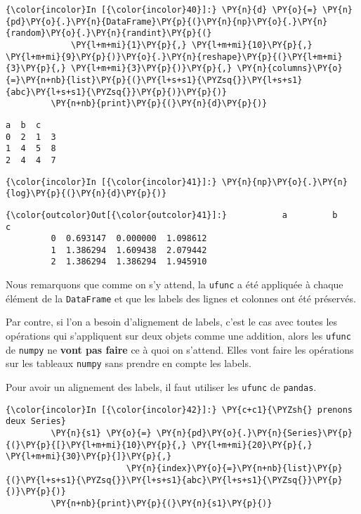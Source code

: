    \begin{Verbatim}[commandchars=\\\{\}]
{\color{incolor}In [{\color{incolor}40}]:} \PY{n}{d} \PY{o}{=} \PY{n}{pd}\PY{o}{.}\PY{n}{DataFrame}\PY{p}{(}\PY{n}{np}\PY{o}{.}\PY{n}{random}\PY{o}{.}\PY{n}{randint}\PY{p}{(}
             \PY{l+m+mi}{1}\PY{p}{,} \PY{l+m+mi}{10}\PY{p}{,} \PY{l+m+mi}{9}\PY{p}{)}\PY{o}{.}\PY{n}{reshape}\PY{p}{(}\PY{l+m+mi}{3}\PY{p}{,} \PY{l+m+mi}{3}\PY{p}{)}\PY{p}{,} \PY{n}{columns}\PY{o}{=}\PY{n+nb}{list}\PY{p}{(}\PY{l+s+s1}{\PYZsq{}}\PY{l+s+s1}{abc}\PY{l+s+s1}{\PYZsq{}}\PY{p}{)}\PY{p}{)}
         \PY{n+nb}{print}\PY{p}{(}\PY{n}{d}\PY{p}{)}
\end{Verbatim}


    \begin{Verbatim}[commandchars=\\\{\}]
   a  b  c
0  2  1  3
1  4  5  8
2  4  4  7

    \end{Verbatim}

    \begin{Verbatim}[commandchars=\\\{\}]
{\color{incolor}In [{\color{incolor}41}]:} \PY{n}{np}\PY{o}{.}\PY{n}{log}\PY{p}{(}\PY{n}{d}\PY{p}{)}
\end{Verbatim}


\begin{Verbatim}[commandchars=\\\{\}]
{\color{outcolor}Out[{\color{outcolor}41}]:}           a         b         c
         0  0.693147  0.000000  1.098612
         1  1.386294  1.609438  2.079442
         2  1.386294  1.386294  1.945910
\end{Verbatim}
            
    Nous remarquons que comme on s'y attend, la \texttt{ufunc} a été
appliquée à chaque élément de la \texttt{DataFrame} et que les labels
des lignes et colonnes ont été préservés.

    Par contre, si l'on a besoin d'alignement de labels, c'est le cas avec
toutes les opérations qui s'appliquent sur deux objets comme une
addition, alors les \texttt{ufunc} de \texttt{numpy} ne \textbf{vont pas
faire} ce à quoi on s'attend. Elles vont faire les opérations sur les
tableaux \texttt{numpy} sans prendre en compte les labels.

Pour avoir un alignement des labels, il faut utiliser les \texttt{ufunc}
de \texttt{pandas}.

    \begin{Verbatim}[commandchars=\\\{\}]
{\color{incolor}In [{\color{incolor}42}]:} \PY{c+c1}{\PYZsh{} prenons deux Series}
         \PY{n}{s1} \PY{o}{=} \PY{n}{pd}\PY{o}{.}\PY{n}{Series}\PY{p}{(}\PY{p}{[}\PY{l+m+mi}{10}\PY{p}{,} \PY{l+m+mi}{20}\PY{p}{,} \PY{l+m+mi}{30}\PY{p}{]}\PY{p}{,}
                        \PY{n}{index}\PY{o}{=}\PY{n+nb}{list}\PY{p}{(}\PY{l+s+s1}{\PYZsq{}}\PY{l+s+s1}{abc}\PY{l+s+s1}{\PYZsq{}}\PY{p}{)}\PY{p}{)}
         \PY{n+nb}{print}\PY{p}{(}\PY{n}{s1}\PY{p}{)}
\end{Verbatim}


